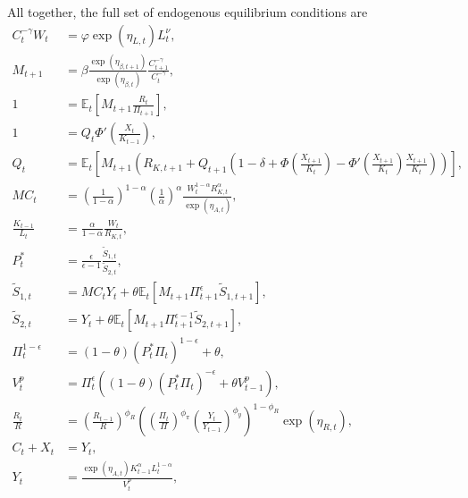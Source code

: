 \documentclass[12 pt, oneside]{article}
\theoremstyle{definition}
\theoremstyle{definition}
\theoremstyle{definition}
\newcommand{\E}{\mathbb{E}}
\begin{document}
All together, the full set of endogenous equilibrium conditions are
\begin{align}
  \label{eq:consumption labor eqm}
    C_t^{-\gamma} W_t & = \varphi\exp(\eta_{L, t}) L_t^\nu,\\
  \label{eq:stochastic discount factor}
  M_{t + 1} & = \beta\frac{\exp(\eta_{\beta, t + 1})}{\exp(\eta_{\beta, t})}\frac{C_{t + 1}^{-\gamma}}{C_t^{-\gamma}},\\
  \label{eq:euler eqn eqm}
  1 & = \E_t\left[M_{t + 1}\frac{R_t}{\Pi_{t + 1}}\right],\\
  \label{eq:tobins q eqm}
  1 & = Q_t \Phi'\left(\frac{X_t}{K_{t - 1}}\right),\\
  \label{eq:capital asset pricing eqm}
  Q_t & = \E_t\left[M_{t + 1} \left(R_{K, t + 1} + Q_{t + 1}\left(1  - \delta + \Phi\left(\frac{X_{t + 1}}{K_t}\right) - \Phi'\left(\frac{X_{t + 1}}{K_t}\right)\frac{X_{t + 1}}{K_t}\right)\right)\right],\\
  \label{eq:mc soln eqm}
  MC_t & =  \left(\frac{1}{1 - \alpha}\right)^{1 - \alpha}\left(\frac{1}{\alpha}\right)^{\alpha}\frac{W_t^{1 - \alpha}R_{K, t}^{\alpha}}{ \exp(\eta_{A, t})},\\
  \label{eq:optimal capital labor ratio eqm}
  \frac{K_{t - 1}}{L_t} & =\frac{\alpha}{1 - \alpha} \frac{W_t}{R_{K, t}},\\
  \label{eq:real optimal reset price eqm}
  P_t^* & = \frac{\epsilon}{\epsilon - 1}\frac{\tilde{S}_{1, t}}{\tilde{S}_{2, t}},\\
  \label{eq:numerator recursion eqm}
  \tilde{S}_{1, t} & = MC_t Y_t + \theta\E_t[M_{t + 1} \Pi_{t + 1}^\epsilon \tilde{S}_{1, t + 1}],\\
  \label{eq:denominator recursion eqm}
  \tilde{S}_{2, t} & =  Y_t + \theta\E_t[M_{t + 1} \Pi_{t + 1}^{\epsilon - 1} \tilde{S}_{2, t + 1}],\\
  \label{eq:inflation from optimal reset price eqm}
  \Pi_t^{ 1 - \epsilon} & = (1 - \theta) (P_t^*\Pi_t)^{1 - \epsilon} + \theta,\\
  \label{eq:price dispersion evol eqm}
  V_t^p & = \Pi_t^{\epsilon}((1 - \theta) (P_t^* \Pi_t)^{-\epsilon} + \theta V_{t - 1}^p),\\
  \label{eq:taylor rule eqm}
  \frac{R_t}{R} & =  \left(\frac{R_{t - 1}}{R}\right)^{\phi_R}\left(\left(\frac{\Pi_t}{\Pi}\right)^{\phi_\pi}\left(\frac{Y_t}{Y_{t - 1}}\right)^{\phi_y}\right)^{1 - \phi_R}\exp(\eta_{R, t}),\\
  \label{eq:output market clearing eqm}
  C_t + X_t & = Y_t,\\
  \label{eq:aggregate supply eqm}
  Y_t & = \frac{\exp(\eta_{A, t}) K_{t - 1}^{\alpha}L_t^{1 - \alpha}}{V_t^p},
\end{align}
\end{document}

